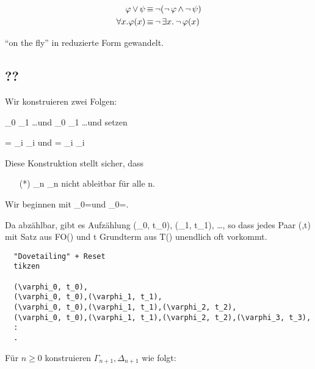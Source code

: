 \begin{align*}
  \varphi \operatorname{\vee} \psi &\operatorname{\equiv} \operatorname{\neg}(\operatorname{\neg}\varphi \operatorname{\wedge} \operatorname{\neg}\psi) \\
  \forall x.\varphi(x) &\operatorname{\equiv} \operatorname{\neg}\exists x.\operatorname{\neg}\varphi(x)
\end{align*}

\enquote{on the fly} in reduzierte Form gewandelt.

\subsection{??}

Wir konstruieren zwei Folgen:

\Gamma_0 \subseteq \Gamma_1 \subseteq \dots und
\Delta_0 \subseteq \Delta_1 \subseteq \dots und setzen

\Gamma* = \bigcup_{i} \Gamma_i und
\Delta* = \bigcup_{i} \Delta_i

Diese Konstruktion stellt sicher, dass
\begin{itemize}
  \item[(*)] \Gamma_n \IMPL \Delta_n nicht ableitbar für alle n.
\end{itemize}

Wir beginnen mit \Gamma_0=\Gamma und \Delta_0=\Delta.

Da \tau abzählbar, gibt es Aufzählung
  (\varphi_0, t_0), (\varphi_1, t_1), \dots,
so dass jedes Paar (\varphi,t) mit \varphi Satz aus FO(\tau) und t Grundterm
aus T(\tau) unendlich oft vorkommt.

\begin{verbatim}
  "Dovetailing" + Reset
  tikzen
  
  (\varphi_0, t_0),
  (\varphi_0, t_0),(\varphi_1, t_1),
  (\varphi_0, t_0),(\varphi_1, t_1),(\varphi_2, t_2),
  (\varphi_0, t_0),(\varphi_1, t_1),(\varphi_2, t_2),(\varphi_3, t_3),
  :
  .
\end{verbatim}

Für $n\geq 0$ konstruieren $\Gamma_{n+1}, \Delta_{n+1}$ wie folgt:

